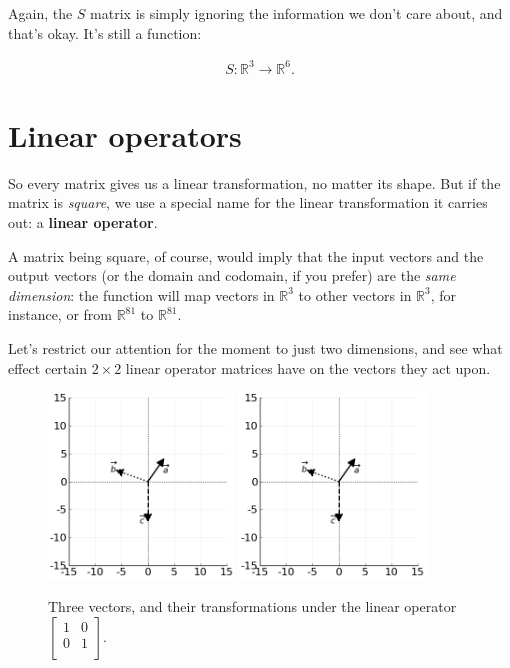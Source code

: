 Again, the $S$ matrix is simply ignoring the information we don't care about,
and that's okay. It's still a function:

\vspace{-.15in}
\begin{align*}
S : \mathbb{R}^3 \rightarrow \mathbb{R}^6.
\end{align*}
\vspace{-.15in}


\section{Linear operators}


So every matrix gives us a linear transformation, no matter its shape. But if
the matrix is \textit{square}, we use a special name for the linear
transformation it carries out: a \textbf{linear operator}.

A matrix being square, of course, would imply that the input vectors and the
output vectors (or the domain and codomain, if you prefer) are the \textit{same
dimension}: the function will map vectors in $\mathbb{R}^3$ to other vectors in
$\mathbb{R}^3$, for instance, or from $\mathbb{R}^{81}$ to $\mathbb{R}^{81}$.

Let's restrict our attention for the moment to just two dimensions, and see
what effect certain $2\times 2$ linear operator matrices have on the vectors
they act upon.

\begin{figure}[hb]
\centering
\includegraphics[width=0.44\textwidth]{preoperators.png}
\includegraphics[width=0.44\textwidth]{preoperators.png}
\caption[.]{Three vectors, and their transformations under the linear operator 
{\scriptsize $\begin{bmatrix} 1 & 0 \\ 0 & 1 \\ \end{bmatrix}$.}}
\label{fig:identityOp}
\end{figure}

